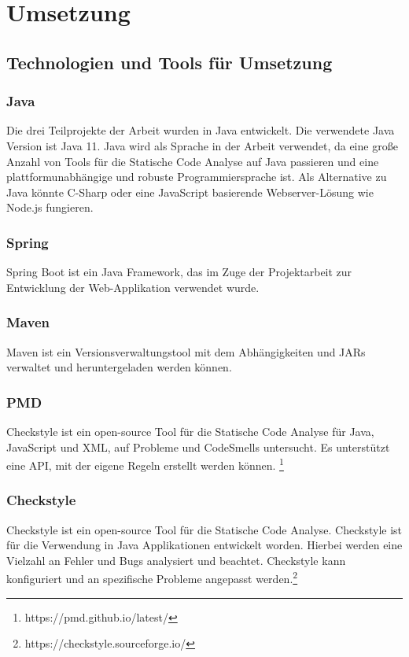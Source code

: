
\chapter{Umsetzung}
\section{Technologien und Tools für Umsetzung } 

\subsection{Java} 
Die drei Teilprojekte der Arbeit wurden in Java entwickelt. Die verwendete Java Version ist Java 11. Java wird als Sprache in der Arbeit verwendet, da eine große Anzahl von Tools für die Statische Code Analyse auf Java passieren und eine plattformunabhängige und robuste Programmiersprache ist. Als Alternative zu Java könnte C-Sharp oder eine JavaScript basierende Webserver-Lösung wie Node.js fungieren.

\subsection{Spring} 
Spring Boot ist ein Java Framework, das im Zuge der Projektarbeit zur Entwicklung der Web-Applikation verwendet wurde.

\subsection{Maven} 
Maven ist ein Versionsverwaltungstool mit dem Abhängigkeiten und JARs verwaltet und heruntergeladen werden können.

\subsection{PMD} 
Checkstyle ist ein open-source Tool für die Statische Code Analyse für Java, JavaScript und XML, auf Probleme und CodeSmells untersucht. Es unterstützt eine API, mit der eigene Regeln erstellt werden können. \footnote{https://pmd.github.io/latest/}

\subsection{Checkstyle} 
Checkstyle ist ein open-source Tool für die Statische Code Analyse. Checkstyle ist für die Verwendung in Java Applikationen entwickelt worden. Hierbei werden eine Vielzahl an Fehler und Bugs analysiert und beachtet. Checkstyle kann konfiguriert und an spezifische Probleme angepasst werden.\footnote{https://checkstyle.sourceforge.io/}

